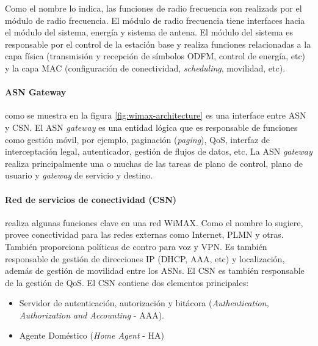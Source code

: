 \documentclass[10pt,journal,compsoc]{IEEEtran}
\begin{document}
Como el nombre lo indica, las funciones de radio frecuencia son realizads por el módulo de radio frecuencia. El módulo de radio frecuencia tiene interfaces hacia el módulo del sistema, energía y sistema de antena. El módulo del sistema es responsable por el control de la estación base y realiza funciones relacionadas a la capa física (transmisión y recepción de símbolos ODFM, control de energía, etc) y la capa MAC (configuración de conectividad, \emph{scheduling}, movilidad, etc).

\paragraph{ASN Gateway} como se muestra en la figura \ref{fig:wimax-architecture} es una interface entre ASN y CSN. El ASN \emph{gateway} es una entidad lógica que es responsable de funciones como gestión móvil, por ejemplo, paginación (\emph{paging}), QoS, interfaz de interceptación legal, autenticador, gestión de flujos de datos, etc. La ASN \emph{gateway} realiza principalmente una o muchas de las tareas de plano de control, plano de usuario y \emph{gateway} de servicio y destino.

\paragraph{Red de servicios de conectividad (CSN)} realiza algunas funciones clave en una red WiMAX. Como el nombre lo sugiere, provee conectividad para las redes externas como Internet, PLMN y otras. También proporciona políticas de contro para voz y VPN. Es también responsable de gestión de direcciones IP (DHCP, AAA, etc) y localización, además de gestión de movilidad entre los ASNs. El CSN es también responsable de la gestión de QoS. El CSN contiene dos elementos principales:
\begin{itemize}
    \item Servidor de autenticación, autorización y bitácora (\emph{Authentication, Authorization and Accounting} - AAA).
    \item Agente Doméstico (\emph{Home Agent} - HA)
\end{itemize}


\end{document}
